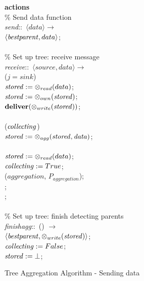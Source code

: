 \begin{figure}[H]
  \centering
  \begin{boxedminipage}{\linewidth}
    \null \textbf{actions}\\
    \null\qq \% Send data function\\
    \null\qq \emph{send}::~$\langle data\rangle \rightarrow$\\
    \null\qq\qq {}$\langle \mbox{\emph{bestparent}}, data\rangle$;\\~\\
    \null\qq \% Set up tree: receive message\\
    \null\qq \emph{receive}::~$\langle source, data\rangle \rightarrow$\\
    \null\qq\qq {} ($j = sink$)  \\
    \null\qq\qq\qq $\mbox{\emph{stored}} \mathrel{:=} \otimes_{read}(data)$; \\
    \null\qq\qq\qq $\mbox{\emph{stored}} \mathrel{:=} \otimes_{own}(\mbox{\emph{stored}})$; \\
    \null\qq\qq\qq $\mbox{\textbf{deliver}}(\otimes_{write}(\mbox{\emph{stored}}))$; \\
    \null\qq\qq {} \\
    \null\qq\qq\qq {} ($\mbox{\emph{collecting}}$)  \\
    \null\qq\qq\qq\qq $\mbox{\emph{stored}} \mathrel{:=} \otimes_{agg}(\mbox{\emph{stored}}, \mbox{\emph{data}})$; \\
    \null\qq\qq\qq {} \\
    \null\qq\qq\qq\qq $\mbox{\emph{stored}} \mathrel{:=} \otimes_{read}(data)$; \\
    \null\qq\qq\qq\qq $\mbox{\emph{collecting}} \mathrel{:=} True$; \\
    \null\qq\qq\qq\qq {}($\mathit{aggregation}$, $P_{aggregation}$); \\
    \null\qq\qq\qq {}; \\
    \null\qq\qq {}; \\~\\
    \null\qq \% Set up tree: finish detecting parents\\
    \null\qq \emph{finishagg}::~() $\rightarrow$\\
    \null\qq\qq {}$\langle \mbox{\emph{bestparent}}, \otimes_{write}(\mbox{\emph{stored}})\rangle$;\\
    \null\qq\qq $\mbox{\emph{collecting}} \mathrel{:=} False$; \\
    \null\qq\qq $\mbox{\emph{stored}} \mathrel{:=} \bot$; \\
  \end{boxedminipage}
  \caption{Tree Aggregation Algorithm - Sending data}
\end{figure}

